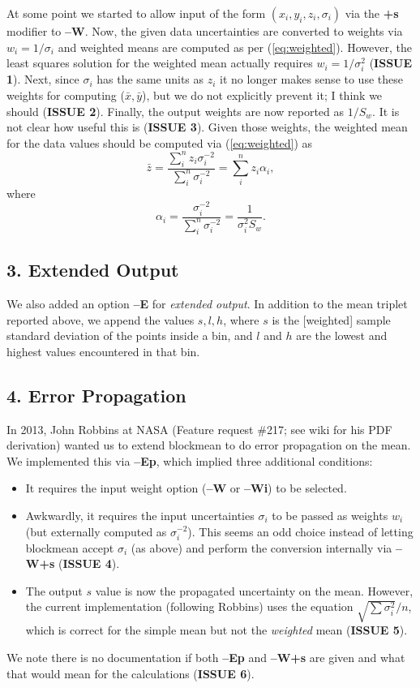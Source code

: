 \documentclass[12pt,letterpaper,margin=0.5in]{report}
\begin{document}
At some point we started to allow input of the form  $(x_i,y_i,z_i,\sigma_i)$ via the {\bf +s} modifier to {\bf--W}. Now,
the given data uncertainties are converted to weights via $w_i = 1/\sigma_i$ and weighted means are computed
as per (\ref{eq:weighted}).  However, the least squares solution for the weighted mean actually requires $w_i = 1/\sigma_i^2$
({\bf ISSUE 1}). Next, since $\sigma_i$ has the same units as $z_i$ it no longer makes sense to use these weights
for computing ($\bar{x}, \bar{y}$), but we do not explicitly prevent it; I think we should ({\bf ISSUE 2}).
Finally, the output weights are now reported as $1/S_w$.  It is not clear how useful this is ({\bf ISSUE 3}).
Given those weights, the weighted mean for the data values should be computed via (\ref{eq:weighted}) as
\begin{equation}
	\bar{z} = \frac{\sum_i^n z_i \sigma_i^{-2}}{\sum_i^n \sigma_i^{-2}} = \sum_i^n z_i \alpha_i,
	\label{eq:w}
\end{equation}
where
\begin{equation}
	\alpha_i = \frac{ \sigma_i^{-2}}{\sum_i^n \sigma_i^{-2}} = \frac{1}{\sigma_i^2 S_w}.
	\label{eq:a}
\end{equation}


\subsection*{3. Extended Output}

We also added an option {\bf --E} for \emph{extended output}.  In addition to the mean triplet reported above, we append
the values $s, l, h$, where $s$ is the [weighted] sample standard deviation of the points inside a bin, and $l$ and
$h$ are the lowest and highest values encountered in that bin.

\subsection*{4. Error Propagation}

In 2013, John Robbins at NASA (Feature request \#217; see wiki for his PDF derivation) wanted us to extend blockmean to do error propagation on the mean.  We implemented
this via {\bf --Ep}, which implied three additional conditions:
\begin{itemize}
	\item It requires the input weight option ({\bf --W} or {\bf --Wi}) to be selected.
	\item Awkwardly, it requires the input uncertainties $\sigma_i$ to be passed as weights $w_i$ (but externally computed as $\sigma_i^{-2}$).
		This seems an odd choice instead of letting blockmean accept $\sigma_i$ (as above) and perform the conversion internally via {\bf --W+s} ({\bf ISSUE 4}).
	\item The output $s$ value is now the propagated uncertainty on the mean.  However, the current implementation (following Robbins)
		uses the equation $\sqrt{\sum \sigma_i^2}/n$, which is correct for the simple mean but not the \emph{weighted} mean ({\bf ISSUE 5}).
\end{itemize}
We note there is no documentation if both {\bf --Ep} and {\bf --W+s} are given and what that would mean for the calculations ({\bf ISSUE 6}).
\end{document}
